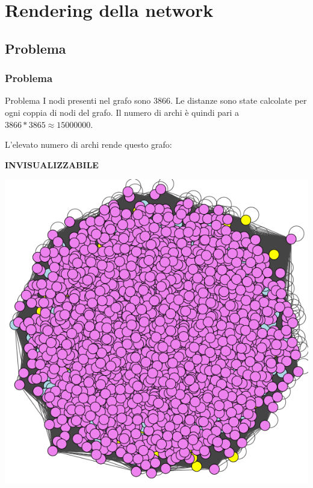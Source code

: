 \documentclass{beamer}
\begin{document}
\section{Rendering della network}
\subsection{Problema}
\begin{frame}
\frametitle{Problema}
\begin{alertblock}{Problema}
I nodi presenti nel grafo sono 3866.
Le distanze sono state calcolate per ogni coppia di nodi del grafo. Il numero di archi è quindi pari a $3866 * 3865 \approx 15000000$.
\end{alertblock}
L'elevato numero di archi rende questo grafo:\\
\begin{center}
\textbf{INVISUALIZZABILE}
\end{center}
\end{frame}

\begin{frame}
\begin{center}
\includegraphics[scale=0.3]{img/inside.png} 
\end{center}
\end{frame}
\end{document}
